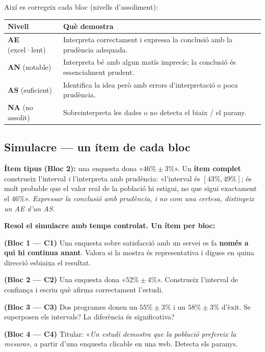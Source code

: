 \noindent Així es corregeix cada bloc (nivells d'assoliment):
\begin{center}
\renewcommand{\arraystretch}{1.3}
\begin{tabular}{p{2.4cm} p{10.2cm}}
\toprule
\textbf{Nivell} & \textbf{Què demostra} \\
\midrule
\textbf{AE} (excel·lent) & Interpreta correctament i expressa la conclusió amb la prudència
adequada. \\
\textbf{AN} (notable) & Interpreta bé amb algun matís imprecís; la conclusió és
essencialment prudent. \\
\textbf{AS} (suficient) & Identifica la idea però amb errors d'interpretació o poca
prudència. \\
\textbf{NA} (no assolit) & Sobreinterpreta les dades o no detecta el biaix / el parany. \\
\bottomrule
\end{tabular}
\end{center}

\subsection{Simulacre — un ítem de cada bloc}

\begin{exemple}
\textbf{Ítem tipus (Bloc 2):} una enquesta dona «$46\%\pm 3\%$». Un \textbf{ítem complet}
construeix l'interval \emph{i} l'interpreta amb prudència: «l'interval és $[43\%,49\%]$; és
molt probable que el valor real de la població hi estigui, no que sigui exactament el
$46\%$». \emph{Expressar la conclusió amb prudència, i no com una certesa, distingeix un AE
d'un AS.}
\end{exemple}

\begin{exercicis}
\textbf{Resol el simulacre amb temps controlat. Un ítem per bloc:}
\begin{exlist}
  \item \textbf{(Bloc 1 — C1)} Una enquesta sobre satisfacció amb un servei es fa
        \textbf{només a qui hi continua anant}. Valora si la mostra és representativa i
        digues en quina direcció esbiaixa el resultat.
  \item \textbf{(Bloc 2 — C2)} Una enquesta dona «$52\%\pm 4\%$». Construeix l'interval de
        confiança i escriu què afirma correctament l'estudi.
  \item \textbf{(Bloc 3 — C3)} Dos programes donen un $55\%\pm 3\%$ i un $58\%\pm 3\%$
        d'èxit. Se superposen els intervals? La diferència és significativa?
  \item \textbf{(Bloc 4 — C4)} Titular: «\emph{Un estudi demostra que la població prefereix
        la mesura}», a partir d'una enquesta clicable en una web. Detecta els paranys.
\end{exlist}
\end{exercicis}

